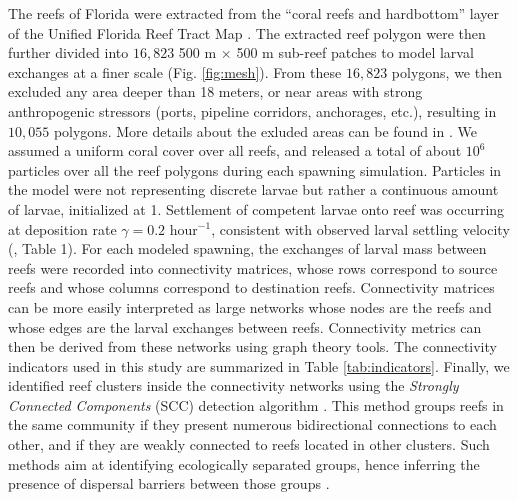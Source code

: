 \documentclass[preprint,12pt,authoryear]{elsarticle}
\begin{document}
	The reefs of Florida were extracted from the “coral reefs and hardbottom” layer of the Unified Florida Reef Tract Map \citep{fwc2017unified}. The extracted reef polygon were then further divided into $16,823$ 500 m $\times$ 500 m sub-reef patches to model larval exchanges at a finer scale (Fig. \ref{fig:mesh}). From these $16,823$ polygons, we then excluded any area deeper than 18 meters, or near areas with strong anthropogenic stressors (ports, pipeline corridors, anchorages, etc.), resulting in $10,055$ polygons. More details about the exluded areas can be found in \cite{tnc2024}. We assumed a uniform coral cover over all reefs, and released a total of about $10^6$ particles over all the reef polygons during each spawning simulation. Particles in the model were not representing discrete larvae but rather a continuous amount of larvae, initialized at 1. Settlement of competent larvae onto reef was occurring at deposition rate $\gamma = 0.2$ hour$^{-1}$, consistent with observed larval settling velocity (\citealp{hata2017coral}, Table 1). For each modeled spawning, the exchanges of larval mass between reefs were recorded into connectivity matrices, whose rows correspond to source reefs and whose columns correspond to destination reefs. Connectivity matrices can be more easily interpreted as large networks whose nodes are the reefs and whose edges are the larval exchanges between reefs. Connectivity metrics can then be derived from these networks using graph theory tools. The connectivity indicators used in this study are summarized in Table \ref{tab:indicators}. Finally, we identified reef clusters inside the connectivity networks using the \textit{Strongly Connected Components} (SCC) detection algorithm \citep{nuutila1994finding}. This method groups reefs in the same community if they present numerous bidirectional connections to each other, and if they are weakly connected to reefs located in other clusters. Such methods aim at identifying ecologically separated groups, hence inferring the presence of dispersal barriers between those groups \citep{thomas2014numerical,saint2023biophysical}.
	
\end{document}

